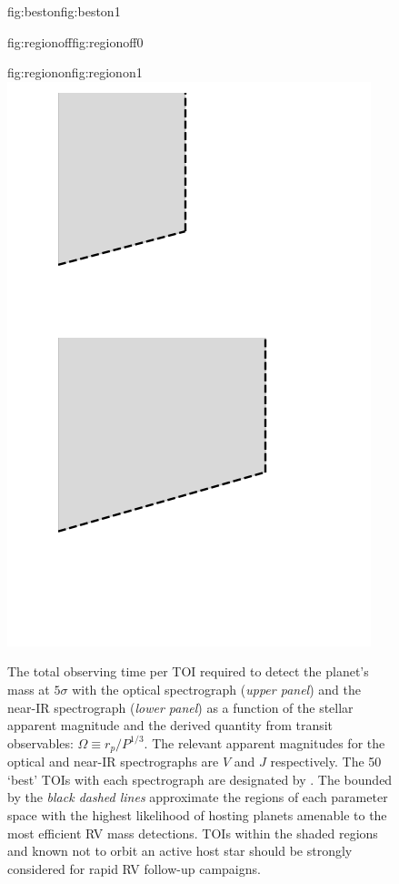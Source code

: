 \begin{figure}
\begin{ocg}{fig:beston}{fig:beston}{1}
  \end{ocg}
  \hspace{-0.6\hsize}%
  \begin{ocg}{fig:regionoff}{fig:regionoff}{0}%
  \end{ocg}%
  \begin{ocg}{fig:regionon}{fig:regionon}{1}%
  \includegraphics[width=0.6\hsize]{figures/identify50_region.png}%
  \end{ocg}
  \hspace{-0.6\hsize}%
  \caption[Identification of the `best' RV follow-up targets from TESS.]
          {\small The total observing time per TOI required to detect the planet's mass at $5\sigma$ with
    the optical spectrograph (\emph{upper panel}) and the near-IR spectrograph
    (\emph{lower panel}) as a function of the stellar apparent magnitude and the derived quantity from
    transit observables: $\Omega \equiv r_p/P^{1/3}$.
    The relevant apparent magnitudes for the optical and near-IR spectrographs are $V$ and $J$ respectively. 
    The 50 `best' TOIs with each spectrograph are designated by
    . The
    bounded by the \emph{black dashed lines} approximate the regions of each parameter space with the highest
    likelihood of hosting planets amenable to the most efficient RV mass detections.
    TOIs within the shaded regions and known not to orbit an active host star should be strongly considered
    for rapid RV follow-up campaigns.}
  \label{RVFCfig:identify50}
\end{figure}

